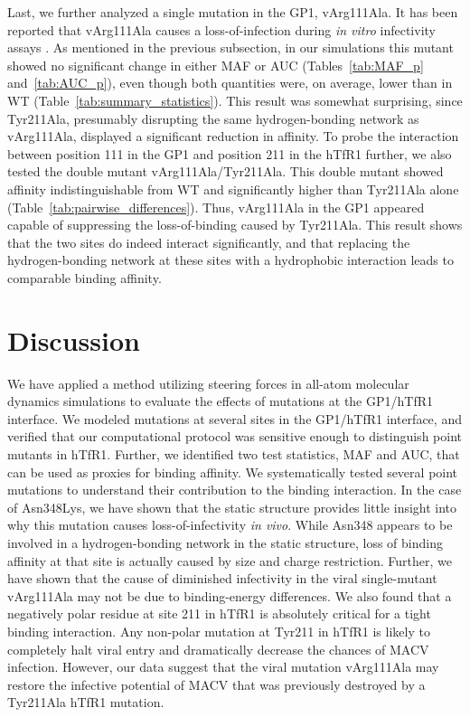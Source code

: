 \documentclass[12pt]{article}
\begin{document}
Last, we further analyzed a single mutation in the GP1, vArg111Ala. It has been reported that vArg111Ala causes a loss-of-infection during \textit{in vitro} infectivity assays \citep{Rad20112}. As mentioned in the previous subsection, in our simulations this mutant showed no significant change in either MAF or AUC (Tables~\ref{tab:MAF_p} and~\ref{tab:AUC_p}), even though both quantities were, on average, lower than in WT (Table~\ref{tab:summary_statistics}). This result was somewhat surprising, since Tyr211Ala, presumably disrupting the same hydrogen-bonding network as vArg111Ala, displayed a significant reduction in affinity. To probe the interaction between position 111 in the GP1 and position 211 in the hTfR1 further, we also tested the double mutant vArg111Ala/Tyr211Ala. This double mutant showed affinity indistinguishable from WT and significantly higher than Tyr211Ala alone  (Table~\ref{tab:pairwise_differences}). Thus, vArg111Ala in the GP1 appeared capable of suppressing the loss-of-binding caused by Tyr211Ala. This result shows that the two sites do indeed interact significantly, and that replacing the hydrogen-bonding network at these sites with a hydrophobic interaction leads to comparable binding affinity.

\section*{Discussion}
We have applied a method utilizing steering forces in all-atom molecular dynamics simulations to evaluate the effects of mutations at the GP1/hTfR1 interface. We modeled mutations at several sites in the GP1/hTfR1 interface, and verified that our computational protocol was sensitive enough to distinguish point mutants in hTfR1. Further, we identified two test statistics, MAF and AUC, that can be used as proxies for binding affinity. We systematically tested several point mutations to understand their contribution to the binding interaction. In the case of Asn348Lys, we have shown that the static structure provides little insight into why this mutation causes loss-of-infectivity \textit{in vivo}. While Asn348 appears to be involved in a hydrogen-bonding network in the static structure, loss of binding affinity at that site is actually caused by size and charge restriction. Further, we have shown that the cause of diminished infectivity in the viral single-mutant vArg111Ala may not be due to binding-energy differences. We also found that a negatively polar residue at site 211 in hTfR1 is absolutely critical for a tight binding interaction. Any non-polar mutation at Tyr211 in hTfR1 is likely to completely halt viral entry and dramatically decrease the chances of MACV infection. However, our data suggest that the viral mutation vArg111Ala may restore the infective potential of MACV that was previously destroyed by a Tyr211Ala hTfR1 mutation.
\end{document}
